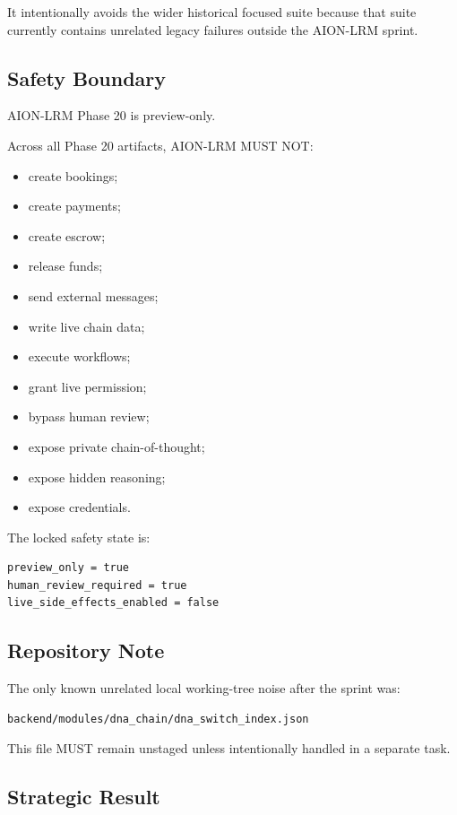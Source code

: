 It intentionally avoids the wider historical focused suite because that suite currently contains unrelated legacy failures outside the AION-LRM sprint.

\subsection{Safety Boundary}

AION-LRM Phase 20 is preview-only.

Across all Phase 20 artifacts, AION-LRM MUST NOT:

\begin{itemize}
  \item create bookings;
  \item create payments;
  \item create escrow;
  \item release funds;
  \item send external messages;
  \item write live chain data;
  \item execute workflows;
  \item grant live permission;
  \item bypass human review;
  \item expose private chain-of-thought;
  \item expose hidden reasoning;
  \item expose credentials.
\end{itemize}

The locked safety state is:

\begin{verbatim}
preview_only = true
human_review_required = true
live_side_effects_enabled = false
\end{verbatim}

\subsection{Repository Note}

The only known unrelated local working-tree noise after the sprint was:

\begin{verbatim}
backend/modules/dna_chain/dna_switch_index.json
\end{verbatim}

This file MUST remain unstaged unless intentionally handled in a separate task.

\subsection{Strategic Result}


